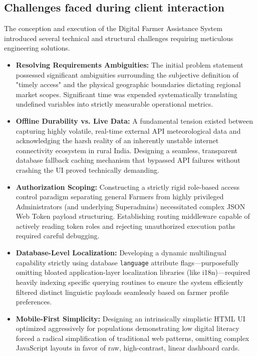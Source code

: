 \subsection{Challenges faced during client interaction}
The conception and execution of the Digital Farmer Assistance System introduced several technical and structural challenges requiring meticulous engineering solutions.
\begin{itemize}
    \item \textbf{Resolving Requirements Ambiguities:} The initial problem statement possessed significant ambiguities surrounding the subjective definition of "timely access" and the physical geographic boundaries dictating regional market scopes. Significant time was expended systematically translating undefined variables into strictly measurable operational metrics.
    \item \textbf{Offline Durability vs. Live Data:} A fundamental tension existed between capturing highly volatile, real-time external API meteorological data and acknowledging the harsh reality of an inherently unstable internet connectivity ecosystem in rural India. Designing a seamless, transparent database fallback caching mechanism that bypassed API failures without crashing the UI proved technically demanding.
    \item \textbf{Authorization Scoping:} Constructing a strictly rigid role-based access control paradigm separating general Farmers from highly privileged Administrators (and underlying Superadmins) necessitated complex JSON Web Token payload structuring. Establishing routing middleware capable of actively reading token roles and rejecting unauthorized execution paths required careful debugging.
    \item \textbf{Database-Level Localization:} Developing a dynamic multilingual capability strictly using database \texttt{language} attribute flags—purposefully omitting bloated application-layer localization libraries (like i18n)—required heavily indexing specific querying routines to ensure the system efficiently filtered distinct linguistic payloads seamlessly based on farmer profile preferences.
    \item \textbf{Mobile-First Simplicity:} Designing an intrinsically simplistic HTML UI optimized aggressively for populations demonstrating low digital literacy forced a radical simplification of traditional web patterns, omitting complex JavaScript layouts in favor of raw, high-contrast, linear dashboard cards.
\end{itemize}

